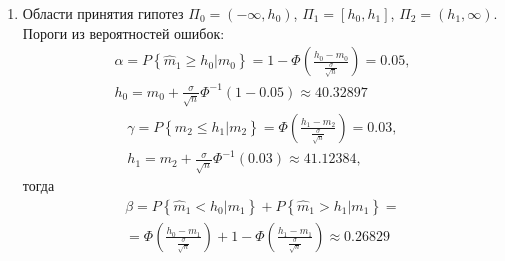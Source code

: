 \documentclass[a4paper,12pt]{article}
\newcommand{\probability}[1]{P \left\{ #1 \right\}}
\begin{document}
\begin{enumerate}
        \item Области принятия гипотез $\Pi_0 = (- \infty, h_0 )$, $\Pi_1 = [h_0, h_1]$, $\Pi_2 = (h_1, \infty )$. Пороги из вероятностей ошибок:
              \begin{gather*}
                  \alpha = \probability{\widehat{m}_1 \ge h_0 | m_0} = 1 - \Phi \left( \frac{h_0 - m_0}{\frac{\sigma}{\sqrt{n}}} \right) = 0.05, \\
                  h_0 = m_0 + \frac{\sigma}{\sqrt{n}} \Phi^{-1} (1 - 0.05) \approx 40.32897
              \end{gather*}
              \begin{gather*}
                  \gamma = \probability{\widehat{m}_2 \le h_1 | m_2} = \Phi \left( \frac{h_1 - m_2}{\frac{\sigma}{\sqrt{n}}} \right) = 0.03, \\
                  h_1 = m_2 + \frac{\sigma}{\sqrt{n}} \Phi^{-1} (0.03) \approx 41.12384 ,
              \end{gather*}
              тогда
              \begin{multline*}
                  \beta
                  = \probability{\widehat{m}_1 < h_0 | m_1} + \probability{\widehat{m}_1 > h_1 | m_1} = \\
                  = \Phi \left( \frac{h_0 - m_1}{\frac{\sigma}{\sqrt{n}}} \right) + 1 - \Phi \left( \frac{h_1 - m_1}{\frac{\sigma}{\sqrt{n}}} \right)
                  \approx 0.26829
              \end{multline*}


\end{enumerate}
\end{document}
